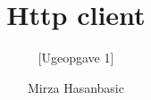 \documentclass{sig-alternate-05-2015}
\begin{document}




\title{Http client}
\subtitle{[Ugeopgave 1]
\titlenote{}}
%
%
%
%
%

%
\author{
%
%
\alignauthor
Mirza Hasanbasic
}

\end{document}
